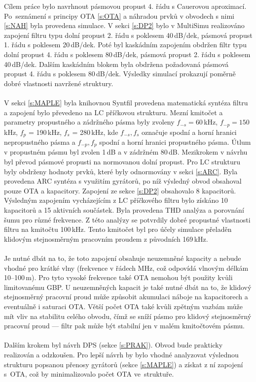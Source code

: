 \noindent Cílem práce bylo navrhnout pásmovou propust 4. řádu s Cauerovou aproximací. Po~seznámení s principy OTA \ref{s:OTA} a náhradou prvků v obvodech s nimi \ref{s:NAH} byla provedena simulace. V sekci \ref{s:DP2} bylo v MultiSimu realizováno zapojení filtru typu dolní propust 2. řádu s poklesem 40\,dB/dek, pásmová propust 1. řádu s poklesem 20\,dB/\mbox{dek}. Poté byl kaskádním zapojením obdržen filtr typu dolní propust 4. řádu s poklesem 80\,dB/dek, pásmová propust 2. řádu s poklesem 40\,dB/dek. Dalším kaskádním blokem byla obdržena požadovaná pásmová propust 4. řádu s poklesem 80\,dB/dek. Výsledky simulací prokazují poměrně dobré vlastnosti navržené struktury.\\
\\
V sekci \ref{s:MAPLE} byla knihovnou Syntfil provedena matematická syntéza filtru a zapojení bylo převedeno na LC příčkovou strukturu. Mezní kmitočet a parametry propustného a zádržného pásma byly zvoleny $f_{-s} = 60$\,kHz, $f_{-p} = 150$\,kHz, 
$f_p$ = 190\,kHz, $f_s$ = 280\,kHz, kde $f_{-s}, f_s$ označuje spodní a horní hranici nepropustného pásma a $f_{-p}, f_p$ spodní a horní hranici propustného pásma. Útlum v propustném pásmu byl zvolen 1\,dB a v zádržném 80\,dB. Mezikrokem v návrhu byl převod pásmové propusti na normovanou dolní propust. Pro LC strukturu byly obdrženy hodnoty prvků, které byly odnormovány v sekci \ref{s:ARC}. Byla provedena ARC syntéza s využitím gyrátorů, po níž výsledný obvod obsahoval pouze OTA a kapacitory. Zapojení ze sekce \ref{s:DP2} obsahovalo 8 kapacitorů. Výsledným zapojením vycházejícím z LC příčkového filtru bylo získáno 10 kapacitorů a 15 aktivních součástek. Byla provedena THD analýza a porovnání šumu pro různé frekvence. Z této analýzy se potvrdily dobré propustné vlastnosti filtru na kmitočtu 100\,kHz. Tento kmitočet byl pro účely simulace přeladěn klidovým stejnosměrným pracovním proudem z původních 169\,kHz. \\
\\
Je nutné dbát na to, že toto zapojení obsahuje neuzemněné kapacity a nebude vhodné pro krátké vlny (frekvence v řádech MHz, což odpovídá vlnovým délkám 10--100\,m). Pro tyto vysoké frekvence také OTA nemohou být použity kvůli limitovanému GBP. U neuzemněných kapacit je také nutné dbát na to, že klidový stejnosměrný pracovní proud může způsobit akumulaci náboje na kapacitorech a eventuálně i saturaci OTA. Větší počet OTA také kvůli zpětným vazbám může mít vliv na stabilitu celého obvodu, čímž se sníží pásmo pro klidový stejnosměrný pracovní proud --- filtr pak může být stabilní jen v malém kmitočtovém pásmu.\\
\\
Dalším krokem byl návrh DPS (sekce \ref{s:PRAK}). Obvod bude prakticky realizován a odzkoušen. Pro lepší návrh by bylo vhodné analyzovat výslednou strukturu popsanou přenosy gyrátorů (sekce \ref{s:MAPLE}) a získat z ní zapojení s~OTA, což by minimalizovalo počet OTA ve~struktuře.